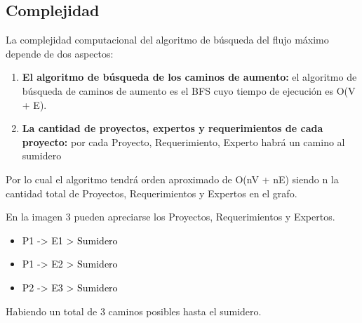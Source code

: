 \documentclass[a4paper,10pt]{article}
\begin{document}
\bigskip

\subsection{Complejidad}

La complejidad computacional del algoritmo de búsqueda del flujo máximo depende de dos aspectos:

\begin{enumerate}

\item \textbf{El algoritmo de búsqueda de los caminos de aumento:}
el algoritmo de búsqueda de caminos de aumento es el BFS cuyo tiempo de ejecución es O(V + E).

\item \textbf{La cantidad de proyectos, expertos y requerimientos de cada proyecto:}
por cada Proyecto, Requerimiento, Experto habrá un camino al sumidero
\end{enumerate}

\bigskip

Por lo cual el algoritmo tendrá orden aproximado de O(nV + nE) siendo n la cantidad total de Proyectos, Requerimientos y Expertos en el grafo.

En la imagen 3 pueden apreciarse los Proyectos, Requerimientos y Expertos.


\begin{itemize}
\item \textcolor{black}{P1 -{\textgreater} E1 {\textgreater} Sumidero}
\item \textcolor{black}{P1 -{\textgreater} E2 {\textgreater} Sumidero}
\item \textcolor{black}{P2 -{\textgreater} E3 {\textgreater} Sumidero}
\end{itemize}

Habiendo un total de 3 caminos posibles hasta el sumidero.
\end{document}
